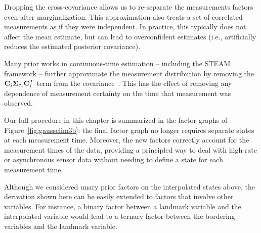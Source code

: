 Dropping the cross-covariance allows us to re-separate the measurements factors even after marginalization. This approximation also treats a set of correlated measurements as if they were independent. In practice, this typically does not affect the mean estimate, but can lead to overconfident estimates (i.e., artificially reduces the estimated posterior covariance).

Many prior works in continuous-time estimation -- including the \ac{STEAM} framework -- further approximate the measurement distribution by removing the $\mathbf{C}_i \mathbf{\Sigma}_{\tau_i}\mathbf{C}_i^T$ term from the covariance~\citep{burnett_tro25}. This has the effect of removing any dependence of measurement certainty on the time that measurement was observed.

Our full procedure in this chapter is summarized in the factor graphs of Figure~\ref{fig:gausselim3b}: the final factor graph no longer requires separate states at each measurement time. Moreover, the new factors correctly account for the measurement times of the data, providing a principled way to deal with high-rate or asynchronous sensor data without needing to define a state for each measurement time. 

Although we considered unary prior factors on the interpolated states above, the derivation shown here can be easily extended to factors that involve other variables. For instance, a binary factor between a landmark variable and the interpolated variable would lead to a ternary factor between the bordering variables and the landmark variable.
